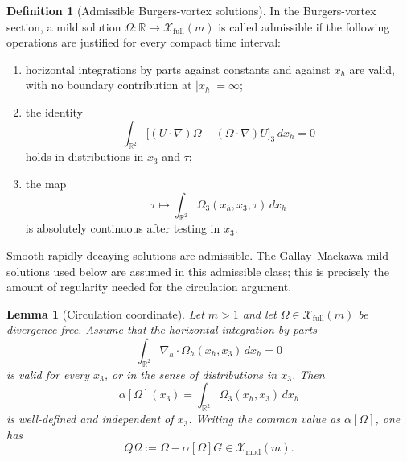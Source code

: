 \documentclass[11pt]{amsart}
\theoremstyle{plain}
\newtheorem{lemma}[theorem]{Lemma}
\theoremstyle{definition}
\newtheorem{definition}[theorem]{Definition}
\theoremstyle{remark}
\numberwithin{equation}{section}
\begin{document}
\begin{definition}[Admissible Burgers-vortex solutions]\label{def:admissible-bv}
In the Burgers-vortex section, a mild solution
\(\Omega:\mathbb R\to\mathcal X_{\mathrm{full}}(m)\) is called admissible if
the following operations are justified for every compact time interval:
\begin{enumerate}[label=\textup{(\roman*)}]
\item horizontal integrations by parts against constants and against
\(x_h\) are valid, with no boundary contribution at \(|x_h|=\infty\);
\item the identity
\[
   \int_{\mathbb R^2}
   \bigl[(U\cdot\nabla)\Omega-(\Omega\cdot\nabla)U\bigr]_3\,dx_h=0
\]
holds in distributions in \(x_3\) and \(\tau\);
\item the map
\[
   \tau\mapsto
   \int_{\mathbb R^2}\Omega_3(x_h,x_3,\tau)\,dx_h
\]
is absolutely continuous after testing in \(x_3\).
\end{enumerate}
Smooth rapidly decaying solutions are admissible.  The Gallay--Maekawa mild
solutions used below are assumed in this admissible class; this is precisely
the amount of regularity needed for the circulation argument.
\end{definition}

\begin{lemma}[Circulation coordinate]\label{lem:circulation}
Let \(m>1\) and let
\(\Omega\in\mathcal X_{\mathrm{full}}(m)\) be divergence-free.  Assume that
the horizontal integration by parts
\[
   \int_{\mathbb R^2}\nabla_h\cdot\Omega_h(x_h,x_3)\,dx_h=0
\]
is valid for every \(x_3\), or in the sense of distributions in \(x_3\).  Then
\[
   \alpha[\Omega](x_3)
   =
   \int_{\mathbb R^2}\Omega_3(x_h,x_3)\,dx_h
\]
is well-defined and independent of \(x_3\).  Writing the common value as
\(\alpha[\Omega]\), one has
\[
   Q\Omega:=\Omega-\alpha[\Omega]G\in\mathcal X_{\mathrm{mod}}(m).
\]
\end{lemma}
\end{document}
